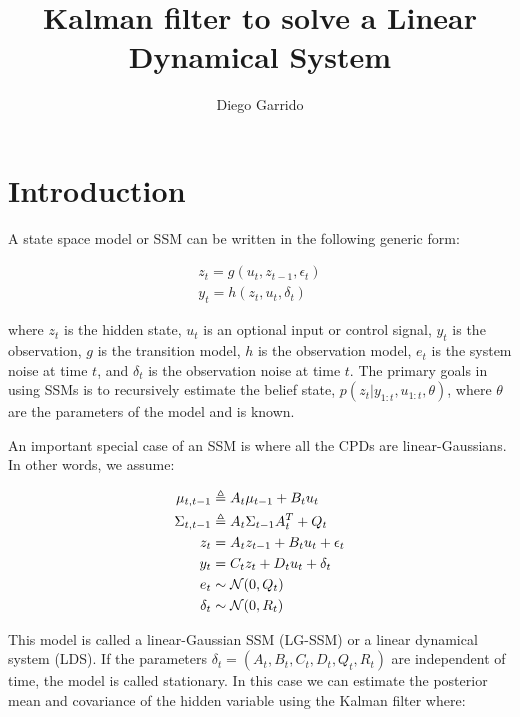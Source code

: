 \documentclass{article}
\title{Kalman filter to solve a Linear Dynamical System}
\author{Diego Garrido}
\begin{document}
\maketitle
\href{https://nbviewer.jupyter.org/github/dgarridoa/Kalman_Filter/blob/master/Kalman_Filter.ipynb}{\color{blue}{Jupyter Notebook}}
\section{Introduction}

A state space model or SSM can be written in the following generic form:

\begin{align}
z_{t} = g(u_{t}, z_{t-1}, \epsilon_{t})\\
y_{t} = h(z_{t}, u_{t}, \delta_{t})
\end{align}

where $z_{t}$ is the hidden state, $u_{t}$ is an optional input or control signal, $y_{t}$ is the observation, $g$ is the transition model, $h$ is the observation model, $e_{t}$ is the system noise at time $t$, and $\delta_{t}$ is the observation noise at time $t$. The primary goals in using SSMs is to recursively estimate the belief state, $p(z_{t}|y_{1:t}, u_{1:t}, \theta)$, where $\theta$ are the parameters of the model and is known.

An important special case of an SSM is where all the CPDs are linear-Gaussians. In other words, we assume:

\begin{align}
\centering
\mu_{t,t-1} & \triangleq A_{t}\mu_{t-1}+B_{t}u_{t}\\
\Sigma_{t,t-1} & \triangleq A_{t}\Sigma_{t-1}A_{t}^{T}+Q_{t}\\
z_{t} &= A_{t}z_{t-1}+B_{t}u_{t}+\epsilon_{t}\\
y_{t} &= C_{t}z_{t}+D_{t}u_{t}+\delta_{t}\\
e_{t} &\sim \mathcal{N}(0, Q_{t})\\
\delta_{t} &\sim \mathcal{N}(0, R_{t})
\end{align}

This model is called a linear-Gaussian SSM (LG-SSM) or a linear dynamical system (LDS). If the parameters $\delta_{t} = (A_{t}, B_{t}, C_{t}, D_{t}, Q_{t}, R_{t})$ are independent of time, the model is called stationary. In this case we can estimate the posterior mean and covariance of the hidden variable using the Kalman filter where:
\end{document}
